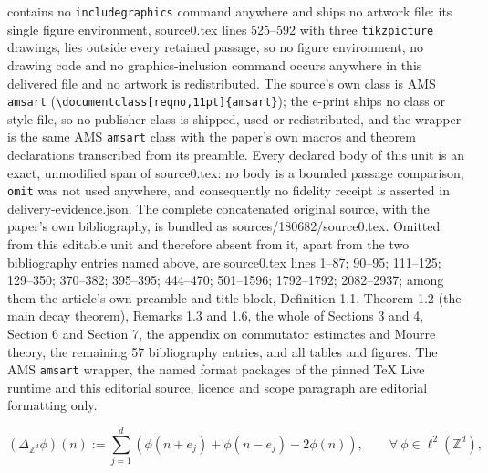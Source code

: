 \documentclass[10pt,a4paper]{amsart}
\newcommand\Z{\mathbb{Z}}
\numberwithin{equation}{section}
\begin{document}
contains no \texttt{includegraphics} command anywhere and ships no artwork file: its single figure environment, source0.tex lines 525--592 with three \texttt{tikzpicture} drawings, lies outside every retained passage, so no figure environment, no drawing code and no graphics-inclusion command occurs anywhere in this delivered file and no artwork is redistributed. The source's own class is AMS \texttt{amsart} (\texttt{\textbackslash documentclass[reqno,11pt]\{amsart\}}); the e-print ships no class or style file, so no publisher class is shipped, used or redistributed, and the wrapper is the same AMS \texttt{amsart} class with the paper's own macros and theorem declarations transcribed from its preamble. Every declared body of this unit is an exact, unmodified span of source0.tex: no body is a bounded passage comparison, \texttt{omit} was not used anywhere, and consequently no fidelity receipt is asserted in delivery-evidence.json. The complete concatenated original source, with the paper's own bibliography, is bundled as sources/180682/source0.tex. Omitted from this editable unit and therefore absent from it, apart from the two bibliography entries named above, are source0.tex lines 1--87; 90--95; 111--125; 129--350; 370--382; 395--395; 444--470; 501--1596; 1792--1792; 2082--2937; among them the article's own preamble and title block, Definition 1.1, Theorem 1.2 (the main decay theorem), Remarks 1.3 and 1.6, the whole of Sections 3 and 4, Section 6 and Section 7, the appendix on commutator estimates and Mourre theory, the remaining 57 bibliography entries, and all tables and figures. The AMS \texttt{amsart} wrapper, the named format packages of the pinned TeX Live runtime and this editorial source, licence and scope paragraph are editorial formatting only.\par\smallskip
\setcounter{section}{1}
\setcounter{equation}{1}
\setcounter{definition}{0}
\begin{equation}\label{definition of Laplacian}
(\Delta_{\Z^d}\phi)(n):=\sum_{j=1}^d(\phi(n+e_j)+\phi(n-e_j)-2\phi(n)), \qquad\forall\ \phi\in\ell^2(\Z^d),
\end{equation}
\end{document}
